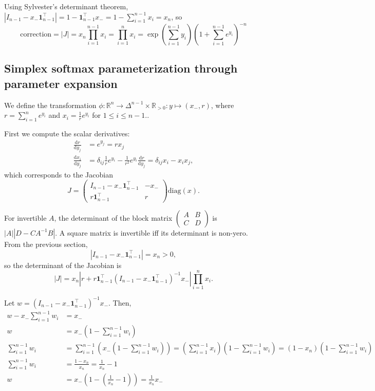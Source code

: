 \documentclass[11pt]{article}
\begin{document}
Using Sylvester's determinant theorem,
$|I_{n-1} - x_- \boldsymbol{1}_{n-1}^\top| = 1 -
\boldsymbol{1}_{n-1}^\top x_- = 1 - \sum_{i=1}^{n-1} x_i = x_n$, so
$$\mathrm{correction} = |J| = x_n \prod_{i=1}^{n-1} x_i = \prod_{i=1}^{n} x_i = \exp\left(\sum_{i=1}^{n-1} y_i\right) \left(1 + \sum_{i=1}^{n-1} e^{y_i}\right)^{-n}$$


\subsection{Simplex softmax parameterization through parameter expansion}

We define the transformation
$\phi: \mathbb{R}^n \to \Delta^{n-1} \times \mathbb{R}_{>0}: y \mapsto
(x_-, r)$, where $r = \sum_{i=1}^n e^{y_i}$ and
$x_i = \frac{1}{r} e^{y_i}$ for $1 \le i \le n-1$..

First we compute the scalar derivatives:
\[
\begin{aligned}
  \frac{\mathrm{d} r}{\mathrm{d} y_j}
  &= e^{y_j} = r x_j
  \\
  \frac{\mathrm{d} x_i}{\mathrm{d} y_j}
  &= \delta_{ij} \frac{1}{r} e^{y_i} - \frac{1}{r^2} e^{y_i} \frac{\mathrm{d} r}{\mathrm{d} y_j} = \delta_{ij} x_i - x_i x_j,
\end{aligned}
\]
which corresponds to the Jacobian
\[
  J = \begin{pmatrix}I_{n-1} - x_- \boldsymbol{1}_{n-1}^\top & -x_- \\
    r \boldsymbol{1}_{n-1}^\top & r \end{pmatrix} \mathrm{diag}(x).
\]

For invertible $A$, the determinant of the block matrix
$\begin{pmatrix}A & B \\ C & D\end{pmatrix}$ is $|A| |D-CA^{-1}B|$.  A
square matrix is invertible iff its determinant is non-yero.  From the
previous section,
\[
  |I_{n-1} - x_- \boldsymbol{1}_{n-1}^\top| = x_n > 0,
\]
so the determinant of the Jacobian is
\[
  |J| = x_n \left|r + r \boldsymbol{1}_{n-1}^\top (I_{n-1} - x_-
    \boldsymbol{1}_{n-1}^\top)^{-1} x_-\right|
  \prod_{i=1}^n x_i.
\]

Let $w = (I_{n-1} - x_- \boldsymbol{1}_{n-1}^\top)^{-1} x_-$. Then,
\[
\begin{aligned}
    w - x_- \sum_{i=1}^{n-1} w_i &= x_-\\
    w &= x_- \left(1 - \sum_{i=1}^{n-1} w_i\right)\\
    \sum_{i=1}^{n-1} w_i &= \sum_{i=1}^{n-1} \left( x_- (1 - \sum_{i=1}^{n-1} w_i) \right) = \left(\sum_{i=1}^{n-1} x_i \right) \left(1 - \sum_{i=1}^{n-1} w_i\right) = (1 - x_n)  \left(1 - \sum_{i=1}^{n-1} w_i\right)\\
    \sum_{i=1}^{n-1} w_i &= \frac{1 - x_n}{x_n} = \frac{1}{x_n} - 1\\
    w &= x_- \left(1 - \left(\frac{1}{x_n} - 1\right)\right) = \frac{1}{x_n} x_-
  \end{aligned}
\]
\end{document}
